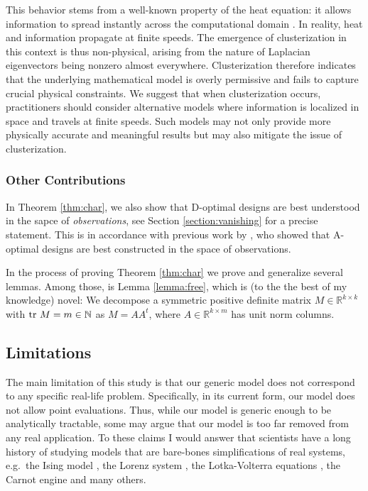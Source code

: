 \documentclass[ba]{imsart}
\newcommand{\ttr}[1]{\textup{tr}\ #1}
\theoremstyle{plain}
\theoremstyle{definition}
\theoremstyle{remark}
\begin{document}
This behavior stems from a well-known property of the heat equation:
it allows information to spread instantly across the computational
domain \cite{renardy2006PDE}. In reality, heat and information
propagate at finite speeds. The emergence of clusterization in this
context is thus non-physical, arising from the nature of Laplacian
eigenvectors being nonzero almost everywhere. Clusterization therefore
indicates that the underlying mathematical model is overly permissive
and fails to capture crucial physical constraints. We suggest that
when clusterization occurs, practitioners should consider alternative
models where information is localized in space and travels at finite
speeds. Such models may not only provide more physically accurate and
meaningful results but may also mitigate the issue of clusterization.



\subsubsection{Other Contributions}
In Theorem \ref{thm:char}, we also show that D-optimal designs are
best understood in the sapce of \emph{observations}, see Section
\ref{section:vanishing} for a precise statement. This is in accordance
with previous work by \cite{koval2020}, who showed that A-optimal
designs are best constructed in the space of observations.

In the process of proving Theorem \ref{thm:char} we prove and
generalize several lemmas. Among those, is Lemma \ref{lemma:free},
which is (to the the best of my knowledge) novel: We decompose a
symmetric positive definite matrix \(M \in \mathbb{R}^{k \times k}\)
with \(\ttr M = m \in \mathbb{N}\) as \(M = AA^t\), where \(A\in
\mathbb{R}^{k \times m}\) has unit norm columns.






\subsection{Limitations}\label{subsec:limitations}
The main limitation of this study is that our generic model does not
correspond to any specific real-life problem. Specifically, in its
current form, our model does not allow point evaluations. Thus, while
our model is generic enough to be analytically tractable, some may
argue that our model is too far removed from any real application. To
these claims I would answer that scientists have a long history of
studying models that are bare-bones simplifications of real systems,
e.g.~the Ising model \cite{cipra1987}, the Lorenz system \cite{brin},
the Lotka-Volterra equations \cite{logan2006}, the Carnot engine
\cite{kardar2007} and many others.
\end{document}
